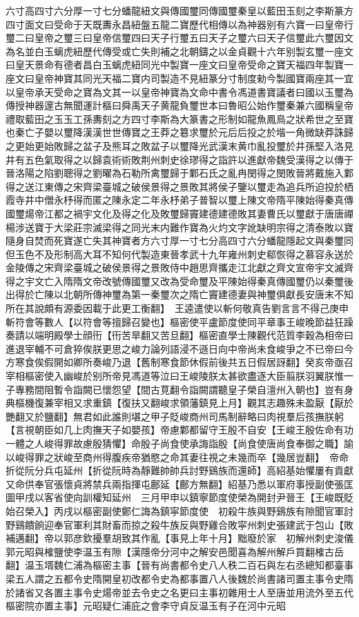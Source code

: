 六寸高四寸六分厚一寸七分蟠龍紐文與傳國璽同傳國璽秦皇以藍田玉刻之李斯篆方四寸面文曰受命于天既夀永昌紐盤五龍二寶歷代相傳以為神器别有六寶一曰皇帝行璽二曰皇帝之璽三曰皇帝信璽四曰天子行璽五曰天子之璽六曰天子信璽此六璽因文為名並白玉螭虎紐歷代傳受或亡失則補之北朝鑄之以金貞觀十六年别製玄璽一座文曰皇天景命有德者昌白玉螭虎紐同光中製寶一座文曰皇帝受命之寶天福四年製寶一座文曰皇帝神寶其同光天福二寶内司製造不見紐篆分寸制度勑今製國寶兩座其一宜以皇帝承天受命之寶為文其一以皇帝神寶為文命中書令馮道書寶議者曰國以玉璽為傳授神器邃古無聞運計樞曰舜禹天子黄龍負璽世本曰魯昭公始作璽秦兼六國稱皇帝禮取藍田之玉玉工孫夀刻之方四寸李斯為大篆書之形制如龍魚鳳鳥之狀希世之至寶也秦亡子嬰以璽降漢漢世世傳寶之王莽之簒求璽於元后后投之於堦一角微缺莽誅歸之更始更始敗歸之盆子及熊耳之敗盆子以璽降光武漢末黄巾亂投璽於井孫堅入洛見井有五色氣取得之以歸袁術術敗荆州刺史徐璆得之詣許以進獻帝魏受漢得之以傳于晉洛陽之陷劉聰得之劉曜為石勒所禽璽歸于鄴石氏之亂冉閔得之閔敗晉將戴施入鄴得之送江東傳之宋齊梁臺城之破侯景得之景敗其將侯子鑒以璽走為追兵所迫投於栖霞寺井中僧永杼得而匿之陳永定二年永杼弟子普智以璽上陳文帝隋平陳始得秦真傳國璽煬帝江都之禍宇文化及得之化及敗璽歸竇建德建德敗其妻曹氏以璽獻于唐唐禪楊涉送寶于大梁莊宗滅梁得之同光末内難作寶為火灼文字訛缺明宗得之清泰敗以寶隨身自焚而死寶遂亡失其神寶者方六寸厚一寸七分高四寸六分蟠龍隱起文與秦璽同但玉色不及形制高大耳不知何代製造東晉孝武十九年雍州刺史郗恢得之慕容永送於金陵傳之宋齊梁臺城之破侯景得之景敗侍中趙思齊攜走江北獻之齊文宣帝宇文滅齊得之宇文亡入隋隋文帝改號傳國璽又改為受命璽及平陳始得秦真傳國璽仍以秦璽後出得於亡陳以北朝所傳神璽為第一秦璽次之隋亡竇建德妻與神璽俱獻長安唐末不知所在其說頗有源委因載于此更工衡翻】　王逵遣使以斬何敬真告劉言言不得己庚申斬符會等數人【以符會等擅歸召變也】樞密使平盧節度使同平章事王峻晚節益狂躁奏請以端明殿學士顔衎【衎苦旱翻又苦旦翻】樞密直學士陳觀代范質李穀為相帝曰進退宰輔不可倉猝俟朕更思之峻力論列語浸不遜日向中帝尚未食峻爭之不已帝曰今方寒食俟假開如卿所奏峻乃退【舊制寒食節休假前後共五日假居訝翻】癸亥帝亟召宰相樞密使入幽峻於别所帝見馮道等泣曰王峻陵朕太甚欲盡逐大臣翦朕羽翼朕惟一子專務間阻暫令詣闕已懷怨望【間古莧翻令詣闕謂聽皇子榮自澶州入朝也】豈有身典樞機復兼宰相又求重鎮【復扶又翻峻求領藩鎮見上月】觀其志趣殊未盈厭【厭於艷翻又於鹽翻】無君如此誰則堪之甲子貶峻商州司馬制辭略曰肉視羣后孩撫朕躬【言視朝臣如几上肉撫天子如嬰孩】帝慮鄴都留守王殷不自安【王峻王殷佐命有功一體之人峻得罪故慮殷猜懼】命殷子尚食使承誨詣殷【尚食使唐尚食奉御之職】諭以峻得罪之狀峻至商州得腹疾帝猶愍之命其妻往視之未幾而卒【幾居豈翻】　帝命折從阮分兵屯延州【折從阮時為靜難帥帥兵討野鷄族而還師】高紹基始懼屢有貢獻又命供奉官張懷貞將禁兵兩指揮屯鄜延【鄜方無翻】紹基乃悉以軍府事授副使張匡圖甲戌以客省使向訓權知延州　三月甲申以鎮寧節度使榮為開封尹晉王【王峻既貶始召榮入】丙戌以樞密副使鄭仁誨為鎮寜節度使　初殺牛族與野鷄族有隙聞官軍討野鷄饋餉迎奉官軍利其財畜而掠之殺牛族反與野雞合敗寜州刺史張建武于包山【敗補邁翻】帝以郭彦欽擾羣胡致其作亂【事見上年十月】黜廢於家　初解州刺史浚儀郭元昭與榷鹽使李温玉有隙【漢隱帝分河中之解安邑聞喜為解州解戶買翻榷古岳翻】温玉壻魏仁浦為樞密主事【晉有尚書都令史八人秩二百石與左右丞總知都臺事梁五人謂之五都令史隋開皇初改都令史為都事置八人後魏於尚書諸司置主事令史隋於諸省又各置主事令史煬帝並去令史之名更曰主事初雜用士人至唐並用流外至五代樞密院亦置主事】元昭疑仁浦庇之會李守貞反温玉有子在河中元昭